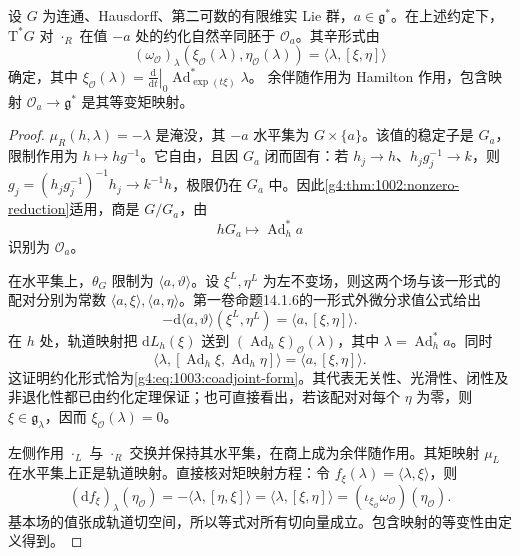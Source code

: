 \begin{theorem}\label{g4:thm:1003:coadjoint-reduction}
	设 \(G\) 为连通、Hausdorff、第二可数的有限维实 Lie 群，\(a\in\mathfrak g^*\)。在上述约定下，\(\mathrm{T}^*G\) 对 \(\cdot_R\) 在值 \(-a\) 处的约化自然辛同胚于 \(\mathcal O_a\)。其辛形式由
	\begin{equation}\label{g4:eq:1003:coadjoint-form}
		(\omega_{\mathcal O})_\lambda
		(\xi_{\mathcal O}(\lambda),\eta_{\mathcal O}(\lambda))
		=\langle\lambda,[\xi,\eta]\rangle
	\end{equation}
	确定，其中
	\(\xi_{\mathcal O}(\lambda)=
	\left.\frac{\mathrm{d}}{\mathrm{d}t}\right|_0
	\operatorname{Ad}_{\exp(t\xi)}^*\lambda\)。
	余伴随作用为 Hamilton 作用，包含映射
	\(\mathcal O_a\to\mathfrak g^*\) 是其等变矩映射。
\end{theorem}
\begin{proof}
	\(\mu_R(h,\lambda)=-\lambda\) 是淹没，其 \(-a\) 水平集为 \(G\times\{a\}\)。该值的稳定子是 \(G_a\)，限制作用为 \(h\mapsto hg^{-1}\)。它自由，且因 \(G_a\) 闭而固有：若 \(h_j\to h\)、\(h_jg_j^{-1}\to k\)，则 \(g_j=(h_jg_j^{-1})^{-1}h_j\to k^{-1}h\)，极限仍在 \(G_a\) 中。因此\cref{g4:thm:1002:nonzero-reduction}适用，商是 \(G/G_a\)，由
	\[
		hG_a\longmapsto\operatorname{Ad}_h^*a
	\]
	识别为 \(\mathcal O_a\)。

	在水平集上，\(\theta_G\) 限制为 \(\langle a,\vartheta\rangle\)。设 \(\xi^L,\eta^L\) 为左不变场，则这两个场与该一形式的配对分别为常数 \(\langle a,\xi\rangle,\langle a,\eta\rangle\)。第一卷命题14.1.6的一形式外微分求值公式给出
	\[
		-\mathrm{d}\langle a,\vartheta\rangle(\xi^L,\eta^L)
		=\langle a,[\xi,\eta]\rangle.
	\]
	在 \(h\) 处，轨道映射把 \(\mathrm{d}L_h(\xi)\) 送到
	\((\operatorname{Ad}_h\xi)_{\mathcal O}(\lambda)\)，其中
	\(\lambda=\operatorname{Ad}_h^*a\)。同时
	\[
		\langle\lambda,[\operatorname{Ad}_h\xi,\operatorname{Ad}_h\eta]\rangle
		=\langle a,[\xi,\eta]\rangle.
	\]
	这证明约化形式恰为\eqref{g4:eq:1003:coadjoint-form}。其代表无关性、光滑性、闭性及非退化性都已由约化定理保证；也可直接看出，若该配对对每个 \(\eta\) 为零，则 \(\xi\in\mathfrak g_\lambda\)，因而 \(\xi_{\mathcal O}(\lambda)=0\)。

	左侧作用 \(\cdot_L\) 与 \(\cdot_R\) 交换并保持其水平集，在商上成为余伴随作用。其矩映射 \(\mu_L\) 在水平集上正是轨道映射。直接核对矩映射方程：令 \(f_\xi(\lambda)=\langle\lambda,\xi\rangle\)，则
	\[
		(\mathrm{d}f_\xi)_\lambda(\eta_{\mathcal O})
		=-\langle\lambda,[\eta,\xi]\rangle
		=\langle\lambda,[\xi,\eta]\rangle
		=(\iota_{\xi_{\mathcal O}}\omega_{\mathcal O})(\eta_{\mathcal O}).
	\]
	基本场的值张成轨道切空间，所以等式对所有切向量成立。包含映射的等变性由定义得到。
\end{proof}

